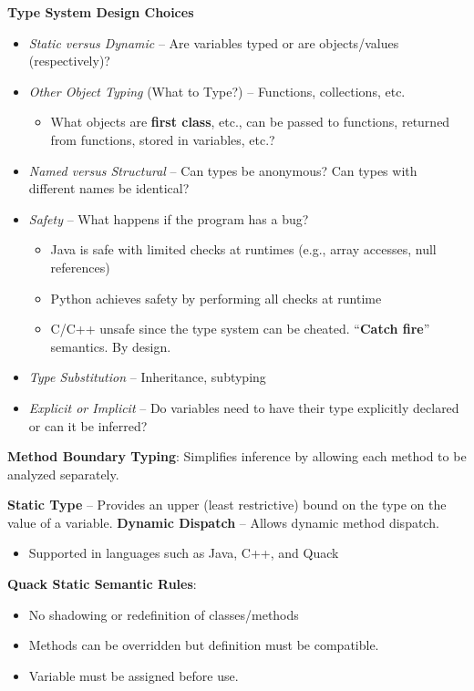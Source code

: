 \documentclass[10pt,twocolumn]{report}
\begin{document}
\textbf{Type System Design Choices}
\begin{itemize}
  \item \textit{Static versus Dynamic} -- Are variables typed or are objects/values (respectively)?
  \item \textit{Other Object Typing} (What to Type?) -- Functions, collections, etc.
    \begin{itemize}
      \item What objects are \textbf{first class}, etc., can be passed to functions, returned from functions, stored in variables, etc.?
    \end{itemize}
  \item \textit{Named versus Structural} -- Can types be anonymous? Can types with different names be identical?
  \item \textit{Safety} -- What happens if the program has a bug?
    \begin{itemize}
      \item Java is safe with limited checks at runtimes (e.g., array accesses, null references)
      \item Python achieves safety by performing all checks at runtime
      \item C/C++ unsafe since the type system can be cheated. ``\textbf{Catch fire}'' semantics. By design.
    \end{itemize}

  \item \textit{Type Substitution} -- Inheritance, subtyping
  \item \textit{Explicit or Implicit} -- Do variables need to have their type explicitly declared or can it be inferred?
\end{itemize}

\textbf{Method Boundary Typing}: Simplifies inference by allowing each method to be analyzed separately.

\textbf{Static Type} -- Provides an upper (least restrictive) bound on the type on the value of a variable. \textbf{Dynamic Dispatch} -- Allows dynamic method dispatch.
\begin{itemize}
  \item Supported in languages such as Java, C++, and Quack
\end{itemize}

\textbf{Quack Static Semantic Rules}:
\begin{itemize}
  \item No shadowing or redefinition of classes/methods
  \item Methods can be overridden but definition must be compatible.
  \item Variable must be assigned before use.
\end{itemize}
\end{document}
